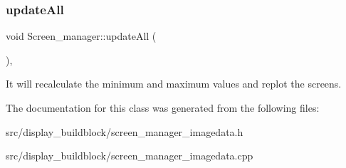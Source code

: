 \subsubsection{\texorpdfstring{update\+All}{updateAll}}
{\footnotesize\ttfamily void Screen\+\_\+manager\+::update\+All (\begin{DoxyParamCaption}{ }\end{DoxyParamCaption})\hspace{0.3cm}{\ttfamily [slot]}, {\ttfamily [inherited]}}

It will recalculate the minimum and maximum values and replot the screens. 

The documentation for this class was generated from the following files\+:\begin{DoxyCompactItemize}
\item 
src/display\+\_\+buildblock/screen\+\_\+manager\+\_\+imagedata.\+h\item 
src/display\+\_\+buildblock/screen\+\_\+manager\+\_\+imagedata.\+cpp\end{DoxyCompactItemize}
